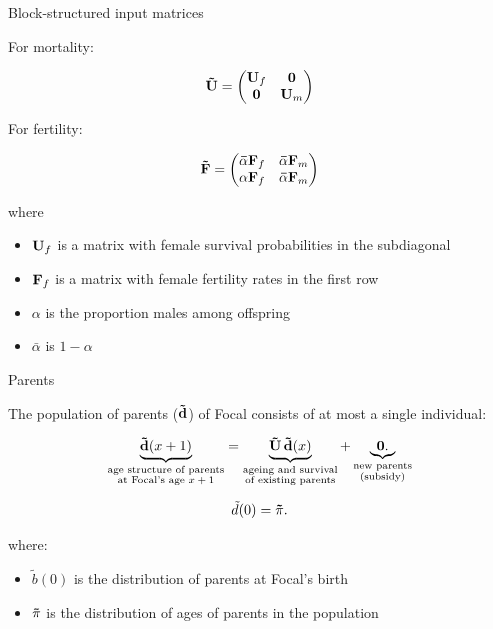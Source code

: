 ﻿\documentclass{beamer}
\begin{document}
\begin{frame}{Block-structured input matrices}

For mortality: 

\begin{equation*}
    {\bf \tilde{U}} = \begin{pmatrix}
    {\bf U}_f & {\bf 0} \\
    {\bf 0} & {\bf U}_m
    \end{pmatrix}
\end{equation*}

\vspace{1cm}

For fertility:

\begin{equation*}
    {\bf \tilde{F}} = \begin{pmatrix}
    {\bf \bar{\alpha} F}_f & {\bf \bar{\alpha} F}_m \\
    {\bf \alpha F}_f & {\bf \bar{\alpha} F}_m
    \end{pmatrix}
\end{equation*}

    where
    \begin{itemize}
        \item ${\bf U}_f$ is a matrix with female survival probabilities in the subdiagonal
        \item ${\bf F}_f$ is a matrix with female fertility rates in the first row 
        \item $\alpha$ is the proportion males among offspring
        \item $\bar{\alpha}$ is $1-\alpha$
    \end{itemize}
\end{frame}

\begin{frame}{Parents}

The population of parents ($\bf \tilde{d}$) of Focal consists of at most a single
individual:

    \begin{equation}
    	\underbrace{{\bf \tilde{d}}(x+1)}_{\substack{\text{age structure of parents}\\ \text{at Focal's age $x+1$}}} = 	
    \underbrace{{\bf \tilde{U} \, \tilde{d}}(x)}_{\substack{\text{ageing and survival}\\ \text{of existing parents}}}
    + 	\underbrace{	{\bf 0}.}_{\substack{\text{new parents}\\ \text{(subsidy)}}}
\end{equation}

\begin{equation*}
    \tilde{d}(0) = {\bf \tilde{\pi}}.
\end{equation*}

where:
\begin{itemize}
    \item $\tilde{b}(0)$ is the distribution of parents at Focal's birth
    \item ${\bf \tilde{\pi}}$ is the distribution of ages of parents in the population
\end{itemize}
\end{frame}
\end{document}
